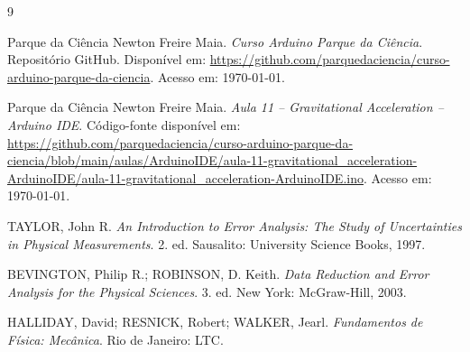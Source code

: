 \documentclass[11pt,a4paper]{article}
\begin{document}
\begin{thebibliography}{9}

Parque da Ciência Newton Freire Maia. \textit{Curso Arduino Parque da Ciência}. Repositório GitHub. Disponível em: \url{https://github.com/parquedaciencia/curso-arduino-parque-da-ciencia}. Acesso em: \today.

Parque da Ciência Newton Freire Maia. \textit{Aula 11 -- Gravitational Acceleration -- Arduino IDE}. Código-fonte disponível em: \url{https://github.com/parquedaciencia/curso-arduino-parque-da-ciencia/blob/main/aulas/ArduinoIDE/aula-11-gravitational_acceleration-ArduinoIDE/aula-11-gravitational_acceleration-ArduinoIDE.ino}. Acesso em: \today.

TAYLOR, John R. \textit{An Introduction to Error Analysis: The Study of Uncertainties in Physical Measurements}. 2. ed. Sausalito: University Science Books, 1997.

BEVINGTON, Philip R.; ROBINSON, D. Keith. \textit{Data Reduction and Error Analysis for the Physical Sciences}. 3. ed. New York: McGraw-Hill, 2003.

HALLIDAY, David; RESNICK, Robert; WALKER, Jearl. \textit{Fundamentos de Física: Mecânica}. Rio de Janeiro: LTC.

\end{thebibliography}
\end{document}
